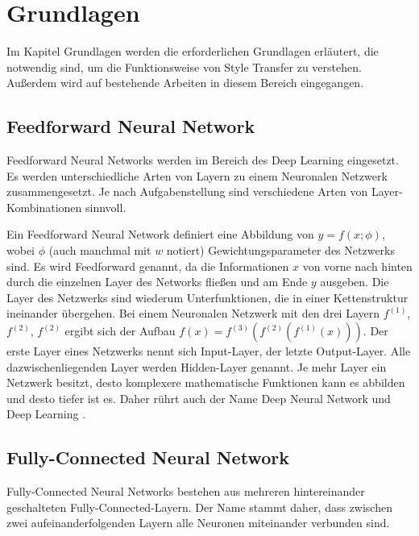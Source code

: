 \chapter{Grundlagen}
\label{cha:fundamentals}

Im Kapitel Grundlagen werden die erforderlichen Grundlagen erläutert, die notwendig sind, um die Funktionsweise von Style Transfer zu verstehen. Außerdem wird auf bestehende Arbeiten in diesem Bereich eingegangen.

\section{Feedforward Neural Network}

Feedforward Neural Networks werden im Bereich des Deep Learning eingesetzt. Es werden unterschiedliche Arten von Layern zu einem Neuronalen Netzwerk zusammengesetzt. Je nach Aufgabenstellung sind verschiedene Arten von Layer-Kombinationen sinnvoll.

Ein Feedforward Neural Network definiert eine Abbildung von $ y = f(x; \phi) $, wobei $ \phi $ (auch manchmal mit $ w $ notiert) Gewichtungsparameter des Netzwerks sind. Es wird Feedforward genannt, da die Informationen $ x $ von vorne nach hinten durch die einzelnen Layer des Networks fließen und am Ende $ y $ ausgeben. Die Layer des Netzwerks sind wiederum Unterfunktionen, die in einer Kettenstruktur ineinander übergehen. Bei einem Neuronalen Netzwerk mit den drei Layern $ f^{(1)} $, $ f^{(2)} $, $ f^{(2)} $ ergibt sich der Aufbau $ f(x) = f^{(3)}(f^{(2)}(f^{(1)}(x))) $. Der erste Layer eines Netzwerks nennt sich Input-Layer, der letzte Output-Layer. Alle dazwischenliegenden Layer werden Hidden-Layer genannt. Je mehr Layer ein Netzwerk besitzt, desto komplexere mathematische Funktionen kann es abbilden und desto tiefer ist es. Daher rührt auch der Name Deep Neural Network und Deep Learning \cite[164-165]{Goodfellow-et-al-2016}.

\pagebreak

\section{Fully-Connected Neural Network}

Fully-Connected Neural Networks bestehen aus mehreren hintereinander geschalteten Fully-Connected-Layern. Der Name stammt daher, dass zwischen zwei aufeinanderfolgenden Layern alle Neuronen miteinander verbunden sind.

